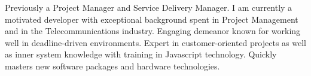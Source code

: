 \documentclass[letter,10pt]{article}
\begin{document}
Previously a Project Manager and Service Delivery Manager. I am currently a motivated developer with exceptional background spent in Project Management and in the Telecommunications industry. Engaging demeanor known for working well in deadline-driven environments. Expert in customer-oriented projects as well as inner system knowledge with training in Javascript technology. Quickly masters new software packages and hardware technologies.


\end{document}
